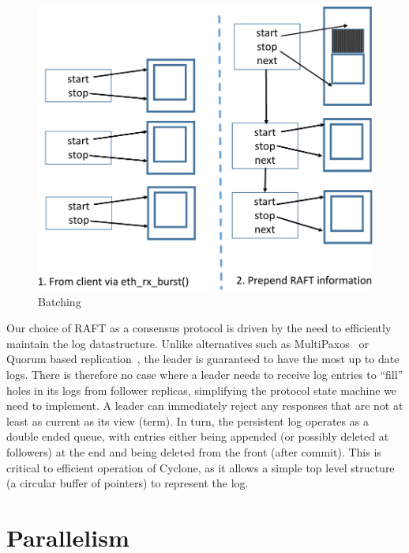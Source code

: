 \documentclass[letterpaper,twocolumn,10pt]{article}
\begin{document}
\begin{figure}
  \centering
  \includegraphics[scale=0.3]{figures2/batching.pdf}
  \caption{Batching}
  \label{fig:batching}
\end{figure}

Our choice of RAFT as a consensus protocol is driven by the need to efficiently
maintain the log datastructure. Unlike alternatives such as
MultiPaxos~\cite{multipaxos} or Quorum based replication~\cite{quorum}, the
leader is guaranteed to have the most up to date logs. There is therefore no
case where a leader needs to receive log entries to ``fill'' holes in its logs
from follower replicas, simplifying the protocol state machine we need to
implement. A leader can immediately reject any responses that are not at least
as current as its view (term). In turn, the persistent log operates as a double
ended queue, with entries either being appended (or possibly deleted at
followers) at the end and being deleted from the front (after commit). This is
critical to efficient operation of Cyclone, as it allows a simple top level
structure (a circular buffer of pointers) to represent the log.

\section{Parallelism}
\label{sec:parallelism}

\end{document}
